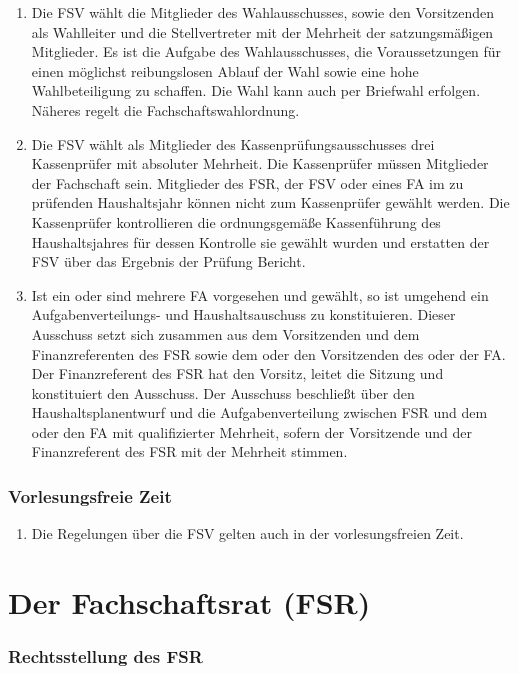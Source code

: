 \documentclass{article}
\begin{document}
\begin{enumerate}[(1)]
	\item Die FSV wählt die Mitglieder des Wahlausschusses, sowie den Vorsitzenden als Wahlleiter und die Stellvertreter mit der Mehrheit der satzungsmäßigen Mitglieder. Es ist die Aufgabe des Wahlausschusses, die Voraussetzungen für einen möglichst reibungslosen Ablauf der Wahl sowie eine hohe Wahlbeteiligung zu schaffen. Die Wahl kann auch per Briefwahl erfolgen. Näheres regelt die Fachschaftswahlordnung.
	\item Die FSV wählt als Mitglieder des Kassenprüfungsausschusses drei Kassenprüfer mit absoluter Mehrheit. Die Kassenprüfer müssen Mitglieder der Fachschaft sein. Mitglieder des FSR, der FSV oder eines FA im zu prüfenden Haushaltsjahr können nicht zum Kassenprüfer gewählt werden. Die Kassenprüfer kontrollieren die ordnungsgemäße Kassenführung des Haushaltsjahres für dessen Kontrolle sie gewählt wurden und erstatten der FSV über das Ergebnis der Prüfung Bericht.
	\item Ist ein oder sind mehrere FA vorgesehen und gewählt, so ist umgehend ein Aufgabenverteilungs- und Haushaltsauschuss zu konstituieren. Dieser Ausschuss setzt sich zusammen aus dem Vorsitzenden und dem Finanzreferenten des FSR sowie dem oder den Vorsitzenden des oder der FA. Der Finanzreferent des FSR hat den Vorsitz, leitet die Sitzung und konstituiert den Ausschuss. Der Ausschuss beschließt über den Haushaltsplanentwurf und die Aufgabenverteilung zwischen FSR und dem oder den FA mit qualifizierter Mehrheit, sofern der Vorsitzende und der Finanzreferent des FSR mit der Mehrheit stimmen.
\end{enumerate}

\section{Vorlesungsfreie Zeit}\label{vorlesungsfreie-zeit}

\begin{enumerate}[(1)]
	\item Die Regelungen über die FSV gelten auch in der vorlesungsfreien Zeit.
\end{enumerate}

\part{Der Fachschaftsrat (FSR)}\label{ii.-der-fachschaftsrat-fsr}

\section{Rechtsstellung des FSR}\label{rechtsstellung-des-fsr}
\end{document}
